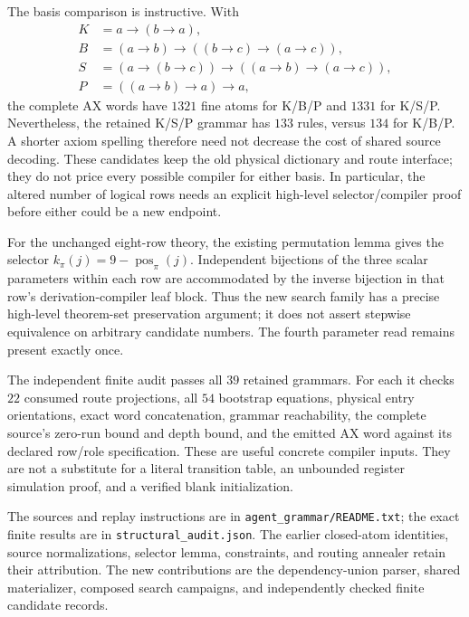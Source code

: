 The basis comparison is instructive. With
\begin{align*}
 K&=a\to(b\to a),\\
 B&=(a\to b)\to((b\to c)\to(a\to c)),\\
 S&=(a\to(b\to c))\to((a\to b)\to(a\to c)),\\
 P&=((a\to b)\to a)\to a,
\end{align*}
the complete AX words have $1321$ fine atoms for K/B/P and $1331$ for K/S/P.
Nevertheless, the retained K/S/P grammar has $133$ rules, versus $134$ for
K/B/P. A shorter axiom spelling therefore need not decrease the cost of
shared source decoding. These candidates keep the old physical dictionary
and route interface; they do not price every possible compiler for either
basis. In particular, the altered number of logical rows needs an explicit
high-level selector/compiler proof before either could be a new endpoint.

For the unchanged eight-row theory, the existing permutation lemma gives
the selector $k_\pi(j)=9-\operatorname{pos}_\pi(j)$. Independent bijections
of the three scalar parameters within each row are accommodated by the
inverse bijection in that row's derivation-compiler leaf block. Thus the
new search family has a precise high-level theorem-set preservation
argument; it does not assert stepwise equivalence on arbitrary candidate
numbers. The fourth parameter read remains present exactly once.

The independent finite audit passes all $39$ retained grammars. For each it
checks $22$ consumed route projections, all $54$ bootstrap equations, physical
entry orientations, exact word concatenation, grammar reachability, the
complete source's zero-run bound and depth bound, and the emitted AX word
against its declared row/role specification. These are useful concrete
compiler inputs. They are not a substitute for a literal transition table,
an unbounded register simulation proof, and a verified blank initialization.

The sources and replay instructions are in \texttt{agent\_grammar/README.txt};
the exact finite results are in \texttt{structural\_audit.json}. The earlier
closed-atom identities, source normalizations, selector lemma, constraints,
and routing annealer retain their attribution. The new contributions are
the dependency-union parser, shared materializer, composed search campaigns,
and independently checked finite candidate records.

